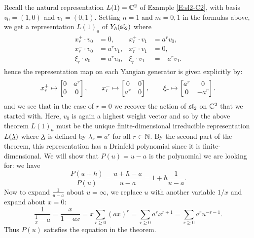 \begin{example}
    Recall the natural representation $L(1)=\mathbb{C}^2$ of Example \ref{E:sl2-C2}, with basis $v_0=(1,0)$ and $v_1=(0,1)$.
    Setting $n=1$ and $m=0,1$ in the formulas above, we get a representation $L(1)_a$ of $Y_\hbar(\mathfrak{sl}_2)$ where
    \begin{align*}
        \begin{split}
            x^+_r\cdot v_0 &= 0, \\
            x^-_r\cdot v_0 &= a^rv_1, \\
            \xi_r\cdot v_0 &= a^rv_0,
        \end{split}
        \begin{split}
            x^+_r\cdot v_1 &= a^rv_0, \\
            x^-_r\cdot v_1 &= 0, \\
            \xi_r\cdot v_1 &= -a^rv_1.
        \end{split}
    \end{align*}
    hence the representation map on each Yangian generator is given explicitly by:
    \[x^+_r\mapsto\bmat{0 & a^r \\ 0 & 0}, \qquad x^-_r\mapsto\bmat{0 & 0 \\ a^r & 0}, \qquad \xi_r\mapsto\bmat{a^r & 0 \\ 0 & -a^r}.\]
    and we see that in the case of $r=0$ we recover the action of $\mathfrak{sl}_2$ on $\mathbb{C}^2$ that we started with.
    Here, $v_0$ is again a highest weight vector and so by the above theorem $L(1)_a$ must be the unique finite-dimensional irreducible representation $L(\underline{\lambda})$ where $\underline{\lambda}$ is defined by $\lambda_r=a^r$ for all $r\in\mathbb{N}$.
    By the second part of the theorem, this representation has a Drinfeld polynomial since it is finite-dimensional.
    We will show that $P(u)=u-a$ is the polynomial we are looking for: we have
    \[\frac{P(u+\hbar)}{P(u)} = \frac{u+\hbar-a}{u-a} = 1+\hbar\frac{1}{u-a}.\]
    Now to expand $\frac{1}{u-a}$ about $u=\infty$, we replace $u$ with another variable $1/x$ and expand about $x=0$:
    \[\frac{1}{\frac{1}{x}-a} = \frac{x}{1-ax} = x\sum_{r\geq 0}(ax)^r = \sum_{r\geq 0}a^rx^{r+1} = \sum_{r\geq 0}a^ru^{-r-1}.\]
    Thus $P(u)$ satisfies the equation in the theorem.
\end{example}
